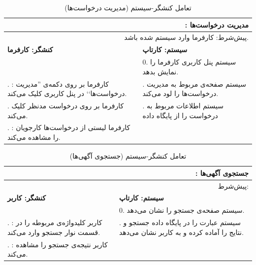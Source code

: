 \documentclass[12pt,svgnames,oneside]{book}
\newcommand{\say}[1]{‍''{#1}`‍`}
\newcommand{\uc}[1]{\lr{UC{#1}}}
\newcommand{\tucbw}{\lr{TUCBW}}
\newcommand{\tucew}{\lr{TUCEW}}
\newcommand{\actorsystem}[1]{
\textbf{کنشگر: {#1}} &
\textbf{سیستم: کارتاپ} \\
}
\newcommand{\zerostep}[1]{
& 0. {#1} \\
}
\newcounter{UseCaseCounter}
\newcommand{\step}[1]{
\stepcounter{UseCaseCounter}\arabic{UseCaseCounter}. {#1}
}
\newcommand{\ucname}[2]{
\multicolumn{2}{|r|}{\uc{{#1}}: {#2}} \\
}
\newcommand{\preif}[1]{
\multicolumn{2}{|r|}{پیش‌شرط:‌ {#1}} \\
}
\begin{document}
\begin{table}[H]
\caption{تعامل کنشگر-سیستم  (مدیریت درخواست‌ها)}
\label{table:uc:req-manage}
\begin{center}
\begin{tabular}{|p{}|p{}|}
\hline

\ucname{22}{مدیریت درخواست‌ها}
\hline

\preif{کارفرما وارد سیستم شده باشد.}
\hline

\actorsystem{کارفرما}
\hline

\zerostep{{\small سیستم پنل کاربری کارفرما را نمایش بدهد.}}
\hline

\step{{\small \textbf{\tucbw}: کارفرما بر روی دکمه‌ی \say{مدیریت درخواست‌ها} در پنل کاربری کلیک می‌کند.}} & 
\step{{\small سیستم صفحه‌ی مربوط به مدیریت درخواست‌ها را لود می‌کند.}} \\
\hline

\step{{\small کارفرما بر روی درخواست مدنظر کلیک می‌کند.}} & 
\step{{\small سیستم اطلاعات مربوط به درخواست را از پایگاه‌ داده}} \\ \hline
\step{{\small \textbf{\tucew}: کارفرما لیستی از درخواست‌ها کارجویان را مشاهده می‌کند.}} & 
\\
\hline

\end{tabular}
\end{center}
\end{table}

\setcounter{UseCaseCounter}{0}
\begin{table}[H]
\caption{تعامل کنشگر-سیستم  (‌جستجوی آگهی‌ها)}
\label{table:uc:apply-search}
\begin{center}
\begin{tabular}{|p{}|p{}|}
\hline

\ucname{23}{جستجوی آگهی‌ها}
\hline

\preif{}
\hline

\actorsystem{کاربر}
\hline

\zerostep{{\small سیستم صفحه‌ی جستجو را نشان می‌دهد.}}
\hline

\step{{\small \textbf{\tucbw}: کاربر کلید‌واژه‌ی مربوطه را در قسمت نوار جستجو وارد می‌کند.}} & 
\step{{\small سیستم عبارت را در پایگاه داده جستجو و نتایج را آماده کرده و به کاربر نشان می‌دهد.}} \\
\hline

\step{{\small \textbf{\tucew}: کاربر نتیجه‌ی جستجو را مشاهده می‌کند.}} & 
\\
\hline

\end{tabular}
\end{center}
\end{table}
\end{document}
